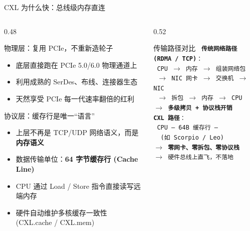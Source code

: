 \documentclass[aspectratio=169, 8pt, UTF8]{ctexbeamer}
\begin{document}
\begin{frame}{CXL 为什么快：总线级内存直连}
  \begin{columns}[T]
    \begin{column}{0.48\textwidth}
      \begin{block}{物理层：复用 PCIe，不重新造轮子}
        \begin{itemize}
          \item 底层直接跑在 PCIe 5.0/6.0 物理通道上
          \item 利用成熟的 SerDes、布线、连接器生态
          \item 天然享受 PCIe 每一代速率翻倍的红利
        \end{itemize}
      \end{block}

      \vspace{6pt}

      \begin{alertblock}{协议层：缓存行是唯一``语言''}
        \begin{itemize}
          \item 上层不再是 TCP/UDP 网络语义，而是\textbf{内存语义}
          \item 数据传输单位：\textbf{64 字节缓存行 (Cache Line)}
          \item CPU 通过 Load / Store 指令直接读写远端内存
          \item 硬件自动维护多核缓存一致性 (CXL.cache / CXL.mem)
        \end{itemize}
      \end{alertblock}
    \end{column}
    \begin{column}{0.52\textwidth}
      \begin{exampleblock}{传输路径对比}
        \vspace{2pt}
        \texttt{%
        \textbf{传统网络路径 (RDMA / TCP)}：\\[3pt]
        \ CPU $\to$ 内存 $\to$ 组装网络包\\[2pt]
        \ $\to$ NIC 网卡 $\to$ 交换机 $\to$ NIC\\[2pt]
        \ $\to$ 拆包 $\to$ 内存 $\to$ CPU\\[3pt]
        $\to$ \textbf{多级拷贝 + 协议栈开销}\\[10pt]
        \textbf{CXL 路径}：\\[3pt]
        \ CPU\ ---\ 64B 缓存行\ ---\ \\[4pt]
        \ \ \quad (如 Scorpio / Leo)\\[3pt]
        $\to$ \textbf{零网卡、零拆包、零协议栈}\\[3pt]
        $\to$ 硬件总线上直飞，不落地%
        }
      \end{exampleblock}


\end{column}
\end{columns}
\end{frame}
\end{document}

